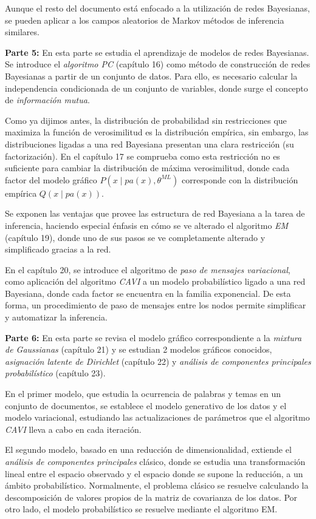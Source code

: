 Aunque el resto del documento está enfocado a la utilización de redes Bayesianas, se pueden aplicar a los campos aleatorios de Markov métodos de inferencia similares.

\textbf{Parte 5:} En esta parte se estudia el aprendizaje de modelos de redes Bayesianas. Se introduce el \emph{algoritmo PC} (capítulo 16) como método de construcción de redes Bayesianas a partir de un conjunto de datos. Para ello, es necesario calcular la independencia condicionada de un conjunto de variables, donde surge el concepto de \emph{información mutua}.

Como ya dijimos antes, la distribución de probabilidad sin restricciones que maximiza la función de verosimilitud es la distribución empírica, sin embargo, las distribuciones ligadas a una red Bayesiana presentan una clara restricción (su factorización). En el capítulo 17 se comprueba como esta restricción no es suficiente para cambiar la distribución de máxima verosimilitud, donde cada factor del modelo gráfico \(P(x \mid pa(x), \theta^{ML})\)  corresponde con la distribución empírica \(Q(x \mid pa(x))\).

Se exponen las ventajas que provee las estructura de red Bayesiana a la tarea de inferencia, haciendo especial énfasis en cómo se ve alterado el algoritmo \emph{EM} (capítulo 19), donde uno de sus pasos se ve completamente alterado y simplificado gracias a la red.

En el capítulo 20, se introduce el algoritmo de \emph{paso de mensajes variacional}, como aplicación del algoritmo \emph{CAVI} a un modelo probabilístico ligado a una red Bayesiana, donde cada factor se encuentra en la familia exponencial. De esta forma, un procedimiento de paso de mensajes entre los nodos permite simplificar y automatizar la inferencia.

\textbf{Parte 6:} En esta parte se revisa el modelo gráfico correspondiente a la \emph{mixtura de Gaussianas} (capítulo 21) y se estudian 2 modelos gráficos conocidos, \emph{asignación latente de Dirichlet} (capítulo 22) y \emph{análisis de componentes principales probabilístico} (capítulo 23).

En el primer modelo, que estudia la ocurrencia de palabras y temas en un conjunto de documentos, se establece el modelo generativo de los datos y el modelo variacional, estudiando las actualizaciones de parámetros que el algoritmo \emph{CAVI} lleva a cabo en cada iteración.

El segundo modelo, basado en una reducción de dimensionalidad, extiende el \emph{análisis de componentes principales} clásico, donde se estudia una transformación lineal entre el espacio observado y el espacio donde se supone la reducción, a un ámbito probabilístico. Normalmente, el problema clásico se resuelve calculando la descomposición de valores propios de la matriz de covarianza de los datos. Por otro lado, el modelo probabilístico se resuelve mediante el algoritmo EM.

